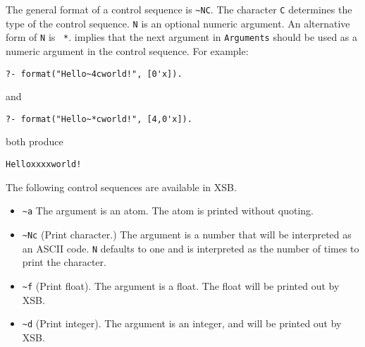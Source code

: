 \begin{description}
The general format of a control sequence is \verb|~NC|.  The character
{\tt C} determines the type of the control sequence.  {\tt N} is an
optional numeric argument.  An alternative form of {\tt N} is {\tt
*}. {\tt *} implies that the next argument in {\tt Arguments} should
be used as a numeric argument in the control sequence.  For example:

\begin{verbatim}
?- format("Hello~4cworld!", [0'x]).
\end{verbatim}

\noindent
and

\begin{verbatim}
?- format("Hello~*cworld!", [4,0'x]).
\end{verbatim}

\noindent
both produce

\begin{verbatim}
Helloxxxxworld!
\end{verbatim}

The following control sequences are available in XSB.


\begin{itemize}

\item \verb|~a|
The argument is an atom.  The atom is printed without quoting.  

\item \verb|~Nc|
(Print character.)  The argument is a number that will be interpreted as an
ASCII code. {\tt N} defaults to one and is interpreted as the number of
times to print the character.  

\item \verb|~f|
(Print float).  The argument is a float.  The float will be printed out by XSB.

\item \verb|~d|
(Print integer).  The argument is an integer, and will be printed out by XSB.

\end{itemize}
\end{description}
